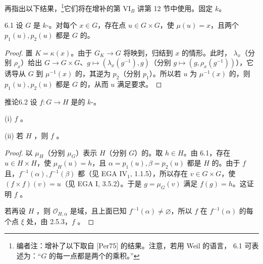 再指出以下结果，\footnote{编者注：增补了以下取自 [Per75] 的结果。注意，若用 Weil 的语言， 6.1 可表述为：“$G$ 的每一点都是两个的乘积。”}它们将在增补的第 VI$_B$ 讲第 12 节中使用。固定 $k$。
\begin{SGAresult}{}{6.1}
设 $G$ 是 $k$-。对每个 $x\in G$，存在点 $u\in G\times G$，使 $\mu(u)=x$，且两个 $p_1(u),p_2(u)$ 都是 $G$ 的。
\end{SGAresult}
\begin{proof}
置 $K=\kappa(x)$。由于 $G_K\to G$ 将映到，归结到 $x$ 的情形。此时， $\lambda_x$（分别 $\rho_x$）给出 $G\to G\times G$、$g\mapsto(\lambda_x(g^{-1}),g)$（分别 $g\mapsto(g,\rho_x(g^{-1}))$），它诱导从 $G$ 到 $\mu^{-1}(x)$ 的，其逆为 $p_2$（分别 $p_1$）。所以若 $u$ 为 $\mu^{-1}(x)$ 的，则 $p_1(u),p_2(u)$ 都是 $G$ 的，从而 $u$ 满足要求。
\end{proof}
\begin{SGAresult}{推论}{6.2}
设 $f:G\to H$ 是的 $k$-。

(i) $f$ 。

(ii) 若 $H$ ，则 $f$ 。
\end{SGAresult}
\begin{proof}
以 $\mu_H$（分别 $\mu_G$）表示 $H$（分别 $G$）的。取 $h\in H$。由 6.1，存在 $u\in H\times H$，使 $\mu_H(u)=h$，且 $\alpha=p_1(u),\beta=p_2(u)$ 都是 $H$ 的。由于 $f$ 且，$f^{-1}(\alpha),f^{-1}(\beta)$ 都（见 EGA IV$_1$, 1.1.5），所以存在 $v\in G\times G$，使 $(f\times f)(v)=u$（见 EGA I, 3.5.2）。于是 $g=\mu_G(v)$ 满足 $f(g)=h$。这证明 $f$ 。

若再设 $H$ ，则 $\mathcal O_{H,\alpha}$ 是域，且上面已知 $f^{-1}(\alpha)\ne\varnothing$，所以 $f$ 在 $f^{-1}(\alpha)$ 的每个点 $\xi$ 处，由 2.5.3，$f$ 。
\end{proof}

